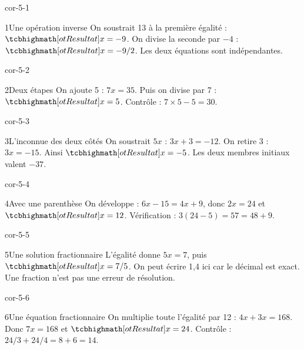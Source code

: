 \clearpage\pagestyle{otMain}\fontsize{11}{15}\selectfont{}
\begin{blocLivre}{cor-5-1}\begin{corrige}{1}{Une opération inverse}
On soustrait 13 à la première égalité : $\res{x=-9}$. On divise la seconde par $-4$ : $\res{x=-9/2}$. Les deux équations sont indépendantes.
\end{corrige}\end{blocLivre}
\begin{blocLivre}{cor-5-2}\begin{corrige}{2}{Deux étapes}
On ajoute 5 : $7x=35$. Puis on divise par 7 : $\res{x=5}$. Contrôle : $7\times5-5=30$.
\end{corrige}\end{blocLivre}
\begin{blocLivre}{cor-5-3}\begin{corrige}{3}{L’inconnue des deux côtés}
On soustrait $5x$ : $3x+3=-12$. On retire 3 : $3x=-15$. Ainsi $\res{x=-5}$. Les deux membres initiaux valent $-37$.
\end{corrige}\end{blocLivre}
\begin{blocLivre}{cor-5-4}\begin{corrige}{4}{Avec une parenthèse}
On développe : $6x-15=4x+9$, donc $2x=24$ et $\res{x=12}$. Vérification : $3(24-5)=57=48+9$.
\end{corrige}\end{blocLivre}
\begin{blocLivre}{cor-5-5}\begin{corrige}{5}{Une solution fractionnaire}
L’égalité donne $5x=7$, puis $\res{x=7/5}$. On peut écrire 1,4 ici car le décimal est exact. Une fraction n’est pas une erreur de résolution.
\end{corrige}\end{blocLivre}
\begin{blocLivre}{cor-5-6}\begin{corrige}{6}{Une équation fractionnaire}
On multiplie toute l’égalité par 12 : $4x+3x=168$. Donc $7x=168$ et $\res{x=24}$. Contrôle : $24/3+24/4=8+6=14$.
\end{corrige}\end{blocLivre}

